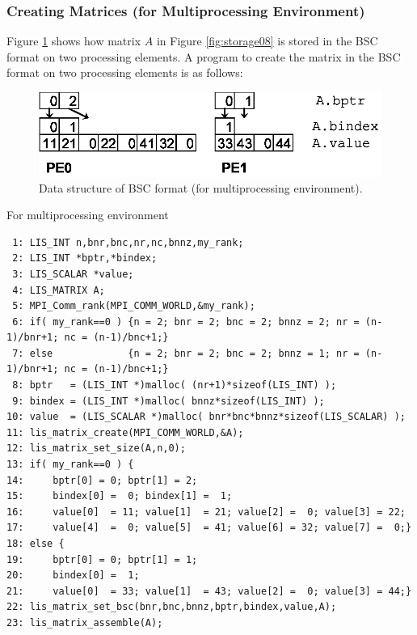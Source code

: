 \documentclass[a4paper]{article}
\begin{document}
\newpage
\subsubsection{Creating Matrices (for Multiprocessing Environment)}
Figure \ref{fig:storage08_mpi} shows how matrix $A$ in Figure
\ref{fig:storage08} is stored in the BSC format on two processing
elements. A program to create the matrix in the BSC format on two processing elements is as follows:
\begin{figure}[h]
{\centering 
\includegraphics{storage08_mpi.eps} 
\caption{Data structure of BSC format (for multiprocessing environment).}\label{fig:storage08_mpi}}
\end{figure}
\begin{itemsquarebox}[l]{For multiprocessing environment}
\small
\begin{verbatim}
 1: LIS_INT n,bnr,bnc,nr,nc,bnnz,my_rank;
 2: LIS_INT *bptr,*bindex;
 3: LIS_SCALAR *value;
 4: LIS_MATRIX A;
 5: MPI_Comm_rank(MPI_COMM_WORLD,&my_rank);
 6: if( my_rank==0 ) {n = 2; bnr = 2; bnc = 2; bnnz = 2; nr = (n-1)/bnr+1; nc = (n-1)/bnc+1;}
 7: else             {n = 2; bnr = 2; bnc = 2; bnnz = 1; nr = (n-1)/bnr+1; nc = (n-1)/bnc+1;}
 8: bptr   = (LIS_INT *)malloc( (nr+1)*sizeof(LIS_INT) );
 9: bindex = (LIS_INT *)malloc( bnnz*sizeof(LIS_INT) );
10: value  = (LIS_SCALAR *)malloc( bnr*bnc*bnnz*sizeof(LIS_SCALAR) );
11: lis_matrix_create(MPI_COMM_WORLD,&A);
12: lis_matrix_set_size(A,n,0);
13: if( my_rank==0 ) {
14:     bptr[0] = 0; bptr[1] = 2;
15:     bindex[0] =  0; bindex[1] =  1;
16:     value[0]  = 11; value[1]  = 21; value[2] =  0; value[3] = 22;
17:     value[4]  =  0; value[5]  = 41; value[6] = 32; value[7] =  0;}
18: else {
19:     bptr[0] = 0; bptr[1] = 1;
20:     bindex[0] =  1;
21:     value[0]  = 33; value[1]  = 43; value[2] =  0; value[3] = 44;}
22: lis_matrix_set_bsc(bnr,bnc,bnnz,bptr,bindex,value,A);
23: lis_matrix_assemble(A);
\end{verbatim}
\end{itemsquarebox}
\end{document}
